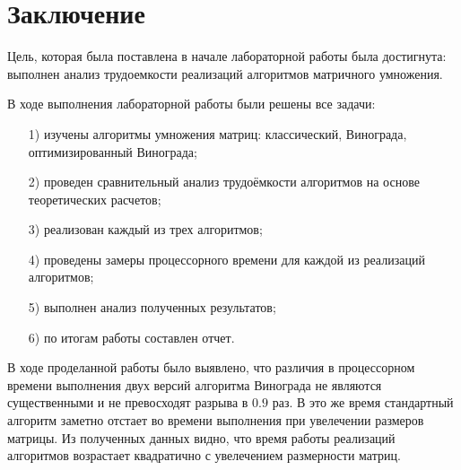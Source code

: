 \chapter*{Заключение}

Цель, которая была поставлена в начале лабораторной работы была достигнута: выполнен анализ трудоемкости реализаций алгоритмов матричного умножения.

В ходе выполнения лабораторной работы были решены все задачи:
\begin{enumerate}
	\item[1)] изучены алгоритмы умножения матриц: классический, Винограда, оптимизированный Винограда;
\item[2)] проведен сравнительный анализ трудоёмкости алгоритмов на основе теоретических расчетов;
\item[3)] реализован каждый из трех алгоритмов;
\item[4)] проведены замеры процессорного времени для каждой из реализаций алгоритмов;
\item[5)] выполнен анализ полученных результатов;
\item[6)] по итогам работы составлен отчет.
\end{enumerate}

В ходе проделанной работы было выявлено, что различия в процессорном времени выполнения двух версий алгоритма Винограда не являются существенными и не превосходят разрыва в $0.9$ раз. В это же время стандартный алгоритм заметно отстает во времени выполнения при увелечении размеров матрицы. Из полученных данных видно, что время работы реализаций алгоритмов возрастает квадратично с увелечением размерности матриц.
